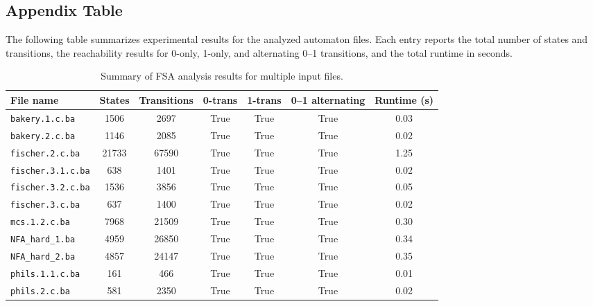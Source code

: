 \documentclass[a4paper,11pt]{article}
\begin{document}
\subsection*{Appendix Table}

The following table summarizes experimental results for the analyzed automaton files.
Each entry reports the total number of states and transitions,
the reachability results for 0-only, 1-only, and alternating 0–1 transitions,
and the total runtime in seconds.

\begin{table}[htbp]
\centering
\begin{tabular}{l|c|c|c|c|c|c}
\textbf{File name} & \textbf{States} & \textbf{Transitions} &
\textbf{0-trans} & \textbf{1-trans} &
\textbf{0–1 alternating} & \textbf{Runtime (s)} \\\hline
\texttt{bakery.1.c.ba} & 1506 & 2697 & True & True & True & 0.03 \\
\texttt{bakery.2.c.ba} & 1146 & 2085 & True & True & True & 0.02 \\
\texttt{fischer.2.c.ba} & 21733 & 67590 & True & True & True & 1.25 \\
\texttt{fischer.3.1.c.ba} & 638 & 1401 & True & True & True & 0.02 \\
\texttt{fischer.3.2.c.ba} & 1536 & 3856 & True & True & True & 0.05 \\
\texttt{fischer.3.c.ba} & 637 & 1400 & True & True & True & 0.02 \\
\texttt{mcs.1.2.c.ba} & 7968 & 21509 & True & True & True & 0.30 \\
\texttt{NFA\_hard\_1.ba} & 4959 & 26850 & True & True & True & 0.34 \\
\texttt{NFA\_hard\_2.ba} & 4857 & 24147 & True & True & True & 0.35 \\
\texttt{phils.1.1.c.ba} & 161 & 466 & True & True & True & 0.01 \\
\texttt{phils.2.c.ba} & 581 & 2350 & True & True & True & 0.02 \\
\end{tabular}
\caption{Summary of FSA analysis results for multiple input files.}
\end{table}
\end{document}
